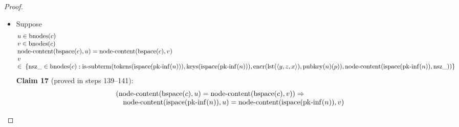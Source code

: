 \documentclass[11pt]{article}
\theoremstyle{plain}
\begin{document}
\begin{proof}
\begin{itemize}[leftmargin=2.8em, itemsep=4pt, parsep=1pt]
  \begin{itemize}[leftmargin=2.8em, itemsep=4pt, parsep=1pt]
  \item[\textbf{133--138}] Suppose 
\begin{equation*}
\begin{array}{@{}l@{}}
u \in \operatorname{bnodes}(c) \\
v \in \operatorname{bnodes}(c) \\
\operatorname{node\text{-}content}(\operatorname{bspace}(c), u) = \operatorname{node\text{-}content}(\operatorname{bspace}(c), v) \\
\begin{array}{@{}l@{}} v \\ \in\; \{\operatorname{nsz\_} \in \operatorname{bnodes}(c) : \operatorname{is\text{-}subterm}(\operatorname{tokens}(\operatorname{ispace}(\operatorname{pk\text{-}inf}(n))), \operatorname{keys}(\operatorname{ispace}(\operatorname{pk\text{-}inf}(n))), \operatorname{encr}(\operatorname{lst}(\langle y, z, x \rangle), \operatorname{pubkey}(n)(p)), \operatorname{node\text{-}content}(\operatorname{ispace}(\operatorname{pk\text{-}inf}(n)), \operatorname{nsz\_}))\} \end{array}
\end{array}
\end{equation*}
\textbf{Claim 17} (proved in steps 139--141):
\begin{equation*}
\begin{array}{@{}l@{}} (\operatorname{node\text{-}content}(\operatorname{bspace}(c), u) = \operatorname{node\text{-}content}(\operatorname{bspace}(c), v)) \Rightarrow  \\ \quad \operatorname{node\text{-}content}(\operatorname{ispace}(\operatorname{pk\text{-}inf}(n)), u) = \operatorname{node\text{-}content}(\operatorname{ispace}(\operatorname{pk\text{-}inf}(n)), v) \end{array}
\end{equation*}


\end{itemize}
\end{itemize}
\end{proof}
\end{document}
